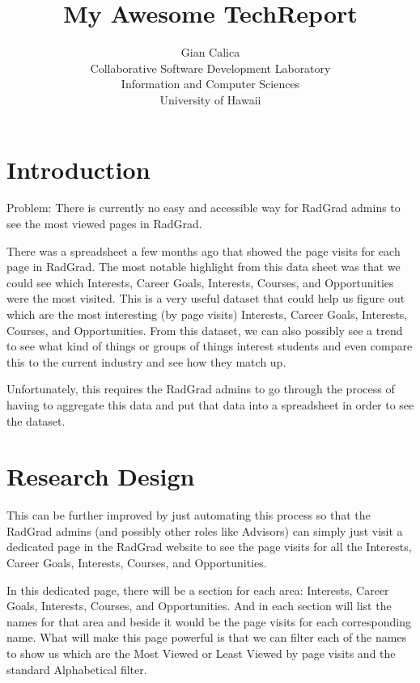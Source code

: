 \documentclass[english]{proposalnsf}
\title{My Awesome TechReport}
\author{Gian Calica \\Collaborative Software Development Laboratory \\ Information and Computer Sciences \\ University of Hawaii}
\begin{document}
    \maketitle
    \tableofcontents
    \newpage

    \section{Introduction}
    \label{sec:introduction}
    Problem: There is currently no easy and accessible way for RadGrad admins to see the most viewed pages in RadGrad.

    There was a spreadsheet a few months ago that showed the page visits for each page in RadGrad.
    The most notable highlight from this data sheet was that we could see which Interests, Career Goals, Interests, Courses, and Opportunities were the most visited.
    This is a very useful dataset that could help us figure out which are the most interesting (by page visits) Interests, Career Goals, Interests, Courses, and Opportunities.
    From this dataset, we can also possibly see a trend to see what kind of things or groups of things interest students and even compare this to the current industry and see how they match up.

    Unfortunately, this requires the RadGrad admins to go through the process of having to aggregate this data and put that data into a spreadsheet in order to see the dataset.

    \section{Research Design}
    \label{sec:research-design}

    This can be further improved by just automating this process so that the RadGrad admins (and possibly other roles like Advisors) can simply just visit a dedicated page in the RadGrad website to see the page visits for all the Interests, Career Goals, Interests, Courses, and Opportunities.

    In this dedicated page, there will be a section for each area: Interests, Career Goals, Interests, Courses, and Opportunities.
    And in each section will list the names for that area and beside it would be the page visits for each corresponding name.
    What will make this page powerful is that we can filter each of the names to show us which are the Most Viewed or Least Viewed by page visits and the standard Alphabetical filter.
\end{document}

